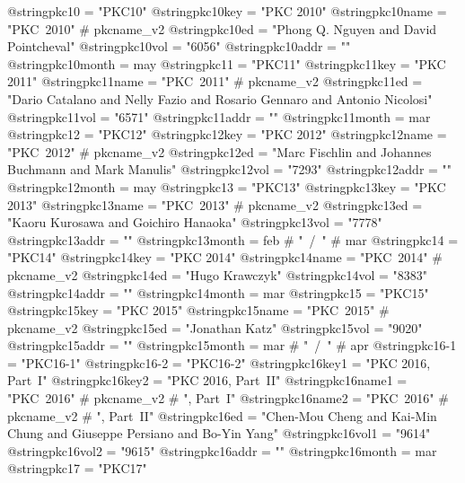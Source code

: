 @string{pkc10 =                 "PKC10"}
@string{pkc10key =              "PKC 2010"}
@string{pkc10name =             "PKC~2010" # pkcname_v2}
@string{pkc10ed =               "Phong Q. Nguyen and David Pointcheval"}
@string{pkc10vol =              "6056"}
@string{pkc10addr =             ""}
@string{pkc10month =            may}
@string{pkc11 =                 "PKC11"}
@string{pkc11key =              "PKC 2011"}
@string{pkc11name =             "PKC~2011" # pkcname_v2}
@string{pkc11ed =               "Dario Catalano and Nelly Fazio and Rosario Gennaro and Antonio Nicolosi"}
@string{pkc11vol =              "6571"}
@string{pkc11addr =             ""}
@string{pkc11month =            mar}
@string{pkc12 =                 "PKC12"}
@string{pkc12key =              "PKC 2012"}
@string{pkc12name =             "PKC~2012" # pkcname_v2}
@string{pkc12ed =               "Marc Fischlin and Johannes Buchmann and Mark Manulis"}
@string{pkc12vol =              "7293"}
@string{pkc12addr =             ""}
@string{pkc12month =            may}
@string{pkc13 =                 "PKC13"}
@string{pkc13key =              "PKC 2013"}
@string{pkc13name =             "PKC~2013" # pkcname_v2}
@string{pkc13ed =               "Kaoru Kurosawa and Goichiro Hanaoka"}
@string{pkc13vol =              "7778"}
@string{pkc13addr =             ""}
@string{pkc13month =            feb # "~/~" # mar}
@string{pkc14 =                 "PKC14"}
@string{pkc14key =              "PKC 2014"}
@string{pkc14name =             "PKC~2014" # pkcname_v2}
@string{pkc14ed =               "Hugo Krawczyk"}
@string{pkc14vol =              "8383"}
@string{pkc14addr =             ""}
@string{pkc14month =            mar}
@string{pkc15 =                 "PKC15"}
@string{pkc15key =              "PKC 2015"}
@string{pkc15name =             "PKC~2015" # pkcname_v2}
@string{pkc15ed =               "Jonathan Katz"}
@string{pkc15vol =              "9020"}
@string{pkc15addr =             ""}
@string{pkc15month =            mar # "~/~" # apr}
@string{pkc16-1 =               "PKC16-1"}
@string{pkc16-2 =               "PKC16-2"}
@string{pkc16key1 =             "PKC 2016, Part~I"}
@string{pkc16key2 =             "PKC 2016, Part~II"}
@string{pkc16name1 =            "PKC~2016" # pkcname_v2 # ", Part~I"}
@string{pkc16name2 =            "PKC~2016" # pkcname_v2 # ", Part~II"}
@string{pkc16ed =               "Chen-Mou Cheng and Kai-Min Chung and Giuseppe Persiano and Bo-Yin Yang"}
@string{pkc16vol1 =             "9614"}
@string{pkc16vol2 =             "9615"}
@string{pkc16addr =             ""}
@string{pkc16month =            mar}
@string{pkc17 =                 "PKC17"}
